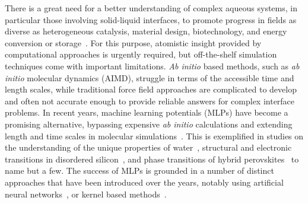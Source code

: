 \documentclass[aip,jcp,amsmath,amssymb,floatfix,reprint,citeautoscript,noeprint]{revtex4-1}
\begin{document}
\begin{bibunit}

%
%
%
%
%
%
%
%
%

%
There is a great need for a better understanding of complex
aqueous systems, in particular those involving solid-liquid interfaces,
to promote progress in fields as diverse
as heterogeneous catalysis, material design, biotechnology, and energy conversion or storage~\cite{Zaera2012/10.1021/cr2002068,Bjorneholm2016/10.1021/acs.chemrev.6b00045}.
%
For this purpose, atomistic insight provided by computational approaches is urgently required, but off-the-shelf simulation techniques come with important limitations.
%
\textit{Ab initio} based methods, such as \textit{ab initio} molecular dynamics (AIMD), struggle in terms of the accessible time and length scales, while traditional force field approaches are complicated to develop and often not accurate enough to provide reliable answers for complex interface problems.
%
In recent years, machine learning potentials (MLPs) have become a promising alternative,
bypassing expensive \textit{ab initio} calculations
and extending length and time scales in molecular simulations~\cite{Behler2016/10.1063/1.4966192,%
Butler2018/10.1038/s41586-018-0337-2,%
Deringer2019/10.1002/adma.201902765,%
Kang2020/10.1021/acs.accounts.0c00472,%
Behler2021/10.1021/acs.chemrev.0c00868%
}.
%
This is exemplified in studies on the understanding of the unique properties of water~\cite{Morawietz2016/10.1073/pnas.1602375113,Cheng2019/10.1073/pnas.1815117116,Gartner2020/10.1073/pnas.2015440117},
structural and electronic transitions in disordered silicon~\cite{Deringer2021/10.1038/s41586-020-03072-z},
and phase transitions of hybrid perovskites~\cite{Jinnouchi2019/10.1103/PhysRevLett.122.225701}
to name but a few.
%
The success of MLPs is grounded in a number of distinct approaches that
have been introduced over the years, notably using
artificial neural networks~\cite{%
Behler2007/10.1103/PhysRevLett.98.146401,%
Ghasemi2015/10.1103/PhysRevB.92.045131,%
Schuett2017/10.1038/ncomms13890,%
Zhang2018/10.1103/PhysRevLett.120.143001,%
Unke2019/10.1021/acs.jctc.9b00181%
},
or kernel based methods~\cite{%
Bartok2010/10.1103/PhysRevLett.104.136403,%
Rupp2012/10.1103/PhysRevLett.108.058301,%
Thompson2015/10.1016/j.jcp.2014.12.018,%
Shapeev2015/10.1137/15M1054183,%
Li2015/10.1103/PhysRevLett.114.096405,%
Chmiela2017/10.1126/sciadv.1603015%
}.


\end{bibunit}
\end{document}

